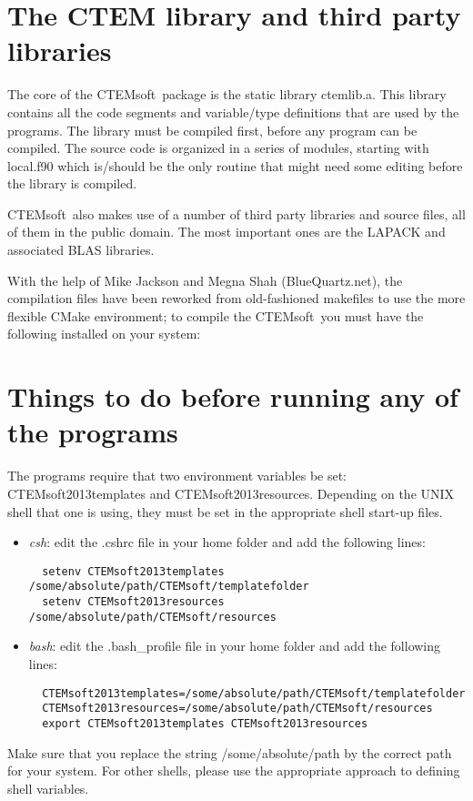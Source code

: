 \documentclass[DIV=calc, paper=letter, fontsize=11pt]{scrartcl}	 %
\newcommand{\ctp}{\textsf{CTEMsoft}}
\begin{document}
\newpage
\section{The CTEM library and third party libraries\label{sec:library}}
The core of the \ctp\ package is the static library \textsf{ctemlib.a}.  This library contains all the code segments and variable/type definitions
that are used by the programs.  The library must be compiled first, before any program can be compiled.  The source code is organized 
in a series of modules, starting with \textsf{local.f90} which is/should be the only routine that might need some editing before the library is 
compiled.  

\ctp\ also makes use of a number of third party libraries and source files, all of them in the public domain.  The most important ones are 
the LAPACK and associated BLAS libraries. 

With the help of Mike Jackson and Megna Shah (BlueQuartz.net), the compilation files have been reworked from old-fashioned
makefiles to use the more flexible CMake environment; to compile the \ctp\ you must have the following installed on your system:




\newpage
\section{Things to do before running any of the programs\label{sec:todo}}
The programs require that two environment variables be set: \textsf{CTEMsoft2013templates} and
\textsf{CTEMsoft2013resources}.  Depending on the UNIX shell that one is using, they must be set in
the appropriate shell start-up files.

\begin{itemize}
\item \textit{csh}: edit the \textsf{.cshrc} file in your home folder and add the following lines:
\begin{verbatim}
  setenv CTEMsoft2013templates /some/absolute/path/CTEMsoft/templatefolder
  setenv CTEMsoft2013resources /some/absolute/path/CTEMsoft/resources
\end{verbatim}
\item \textit{bash}: edit the \textsf{.bash\_profile} file in your home folder and add the following lines:
\begin{verbatim}
  CTEMsoft2013templates=/some/absolute/path/CTEMsoft/templatefolder
  CTEMsoft2013resources=/some/absolute/path/CTEMsoft/resources
  export CTEMsoft2013templates CTEMsoft2013resources
\end{verbatim}
\end{itemize}
Make sure that you replace the string \textsf{/some/absolute/path} by the correct path for your system.
For other shells, please use the appropriate approach to defining shell variables.
\end{document}
